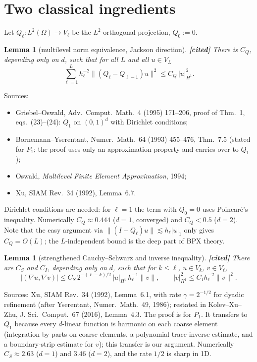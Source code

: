\documentclass[11pt,a4paper]{article}
\newtheorem{lemma}[theorem]{Lemma}
\theoremstyle{remark}
\begin{document}
\section{Two classical ingredients}

Let $Q_\ell:L^2(\Omega)\to V_\ell$ be the $L^2$-orthogonal projection, $Q_0:=0$.

\begin{lemma}[multilevel norm equivalence, Jackson direction]\label{lem:jackson}
\textbf{[cited]} There is $C_Q$, depending only on $d$, such that for all
$L$ and all $u\in V_L$
\[
\sum_{\ell=1}^Lh_\ell^{-2}\|(Q_\ell-Q_{\ell-1})u\|^2\le C_Q\,|u|_{H^1}^2 .
\]
\end{lemma}
\noindent Sources:
\begin{itemize}
\item Griebel--Oswald, Adv.\ Comput.\ Math.\ 4 (1995) 171--206, proof of
  Thm.~1, eqs.~(23)--(24): $Q_1$ on $(0,1)^d$ with Dirichlet conditions;
\item Bornemann--Yserentant, Numer.\ Math.\ 64 (1993) 455--476, Thm.~7.5
  (stated for $P_1$; the proof uses only an approximation property and
  carries over to $Q_1$);
\item Oswald, \emph{Multilevel Finite Element Approximation}, 1994;
\item Xu, SIAM Rev.\ 34 (1992), Lemma~6.7.
\end{itemize}
Dirichlet conditions are needed: for $\ell=1$ the term with $Q_0=0$ uses
Poincar\'e's inequality. Numerically $C_Q\approx0.444$ ($d=1$, converged) and
$C_Q<0.5$ ($d=2$).
Note that
the easy argument via $\|(I-Q_\ell)u\|\lesssim h_\ell|u|_1$ only gives $C_Q=O(L)$; the
$L$-independent bound is the deep part of BPX theory.

\begin{lemma}[strengthened Cauchy--Schwarz and inverse inequality]\label{lem:scs}
\textbf{[cited]} There are $C_S$ and $C_I$, depending only on $d$, such that
for $k\le\ell$, $u\in V_k$, $v\in V_\ell$,
\[
|(\nabla u,\nabla v)|\le C_S\,2^{-(\ell-k)/2}\,|u|_{H^1}\,h_\ell^{-1}\|v\|,\qquad
|v|_{H^1}^2\le C_Ih_\ell^{-2}\|v\|^2 .
\]
\end{lemma}
\noindent Sources: Xu, SIAM Rev.\ 34 (1992), Lemma~6.1, with rate
$\gamma=2^{-1/2}$ for dyadic refinement (after Yserentant, Numer.\ Math.\ 49,
1986); restated in Kolev--Xu--Zhu, J. Sci.\ Comput.\ 67 (2016), Lemma~4.3. The
proof is for $P_1$. It transfers to $Q_1$ because every $d$-linear function
is harmonic on each coarse element (integration by parts on coarse
elements, a polynomial trace-inverse estimate, and a boundary-strip
estimate for $v$); this transfer is our argument. Numerically $C_S\approx2.63$
($d=1$) and $3.46$ ($d=2$), and the rate $1/2$ is sharp in 1D.
\end{document}
